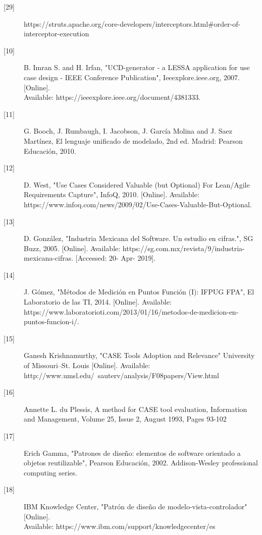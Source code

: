 \begin{description}
		
		\item[\hypertarget{b29}{[29]}]
		https://struts.apache.org/core-developers/interceptors.html\#order-of-interceptor-execution
		
		\item[\hypertarget{b10}{[10]}] B. Imran S. and H. Irfan, "UCD-generator - a LESSA application for use case design - IEEE Conference Publication", Ieeexplore.ieee.org, 2007. [Online]. \\Available: https://ieeexplore.ieee.org/document/4381333.
		
		\item[\hypertarget{b11}{[11]}] G. Booch, J. Rumbaugh, I. Jacobson, J. García Molina and J. Saez Martínez, El lenguaje unificado de modelado, 2nd ed. Madrid: Pearson Educación, 2010.
		
		\item[\hypertarget{b12}{[12]}] D. West, "Use Cases Considered Valuable (but Optional) For Lean/Agile Requirements Capture", InfoQ, 2010. [Online]. Available: https://www.infoq.com/news/2009/02/Use-Cases-Valuable-But-Optional. 
		
		\item[\hypertarget{b13}{[13]}] D. González, "Industria Mexicana del Software. Un estudio en cifras.", SG Buzz, 2005. [Online]. Available: https://sg.com.mx/revista/9/industria-mexicana-cifras. [Accessed: 20- Apr- 2019].
		
		\item[\hypertarget{b14}{[14]}] J. Gómez, "Métodos de Medición en Puntos Función (I): IFPUG FPA", El Laboratorio de las TI, 2014. [Online]. Available: https://www.laboratorioti.com/2013/01/16/metodos-de-medicion-en-puntos-funcion-i/. 
		
		\item[\hypertarget{b15}{[15]}] Ganesh Krishnamurthy, "CASE Tools 
		Adoption and Relevance" University of Missouri–St. Louis [Online]. Available: http://www.umsl.edu/~sauterv/analysis/F08papers/View.html
		
		\item[\hypertarget{b16}{[16]}] Annette L. du Plessis, A method for CASE tool evaluation, Information and Management, Volume 25, Issue 2, August 1993, Pages 93-102
		
		\item[\hypertarget{b17}{[17]}]	Erich Gamma, "Patrones de diseño: elementos de software orientado a objetos reutilizable", Pearson Educación, 2002. Addison-Wesley professional computing series.
		
		\item[\hypertarget{b18}{[18]}] IBM Knowledge Center, "Patrón de diseño de modelo-vista-controlador" [Online].\\ Available: https://www.ibm.com/support/knowledgecenter/es
		

\end{description}

